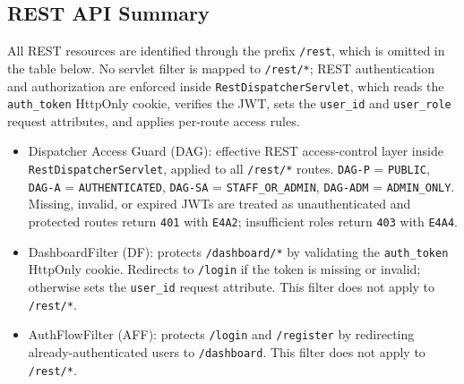 \subsection{REST API Summary}

All REST resources are identified through the prefix \texttt{/rest}, which is omitted in the table below. No servlet filter is mapped to \texttt{/rest/*}; REST authentication and authorization are enforced inside \texttt{RestDispatcherServlet}, which reads the \texttt{auth\_token} HttpOnly cookie, verifies the JWT, sets the \texttt{user\_id} and \texttt{user\_role} request attributes, and applies per-route access rules.

\begin{itemize}
\item Dispatcher Access Guard (DAG): effective REST access-control layer inside \texttt{RestDispatcherServlet}, applied to all \texttt{/rest/*} routes. \texttt{DAG-P} = \texttt{PUBLIC}, \texttt{DAG-A} = \texttt{AUTHENTICATED}, \texttt{DAG-SA} = \texttt{STAFF\_OR\_ADMIN}, \texttt{DAG-ADM} = \texttt{ADMIN\_ONLY}. Missing, invalid, or expired JWTs are treated as unauthenticated and protected routes return \texttt{401} with \texttt{E4A2}; insufficient roles return \texttt{403} with \texttt{E4A4}.
\item DashboardFilter (DF): protects \texttt{/dashboard/*} by validating the \texttt{auth\_token} HttpOnly cookie. Redirects to \texttt{/login} if the token is missing or invalid; otherwise sets the \texttt{user\_id} request attribute. This filter does not apply to \texttt{/rest/*}.
\item AuthFlowFilter (AFF): protects \texttt{/login} and \texttt{/register} by redirecting already-authenticated users to \texttt{/dashboard}. This filter does not apply to \texttt{/rest/*}.
\end{itemize}


